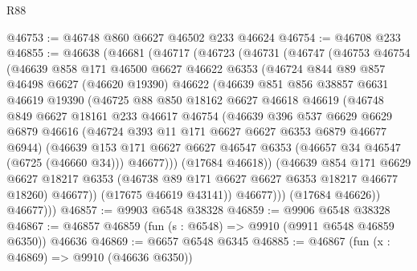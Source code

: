 \begin{lexlean}{R88}
\begin{coremodule}
@46753 := @46748 @860 @6627 @46502 @233 @46624
@46754 := @46708 @233
@46855 := @46638
    (@46681
      (@46717
        (@46723
          (@46731
            (@46747
              (@46753
                @46754
                (@46639
                  @858
                  @171
                  @46500
                  @6627
                  @46622
                  @6353
                  (@46724
                    @844
                    @89
                    @857
                    @46498
                    @6627
                    (@46620 @19390)
                    @46622
                    (@46639
                      @851
                      @856
                      @38857
                      @6631
                      @46619
                      @19390
                      (@46725
                        @88
                        @850
                        @18162
                        @6627
                        @46618
                        @46619
                        (@46748
                          @849
                          @6627
                          @18161
                          @233
                          @46617
                          @46754
                          (@46639
                            @396
                            @537
                            @6629
                            @6629
                            @6879
                            @46616
                            (@46724 @393 @11 @171 @6627 @6627 @6353 @6879 @46677 @6944)
                            (@46639
                              @153
                              @171
                              @6627
                              @6627
                              @46547
                              @6353
                              (@46657 @34 @46547 (@6725 (@46660 @34)))
                              @46677)))
                        (@17684 @46618))
                      (@46639
                        @854
                        @171
                        @6629
                        @6627
                        @18217
                        @6353
                        (@46738 @89 @171 @6627 @6627 @6353 @18217 @46677 @18260)
                        @46677))
                    (@17675 @46619 @43141))
                  @46677)))
            (@17684 @46626))
          @46677)))
@46857 := @9903 @6548 @38328
@46859 := @9906 @6548 @38328
@46867 := @46857 @46859 (fun (s : @6548) => @9910 (@9911 @6548 @46859 @6350)) @46636
@46869 := @6657 @6548 @6345
@46885 := @46867
    (fun (x : @46869) => @9910 (@46636 @6350))

\end{coremodule}
\end{lexlean}
